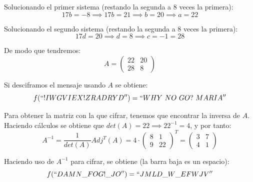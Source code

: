 \begin{problem}[3]
Solucionando el primer sistema (restando la segunda a 8 veces la primera):
\[17b = -8 \implies 17b = 21 \implies b = 20 \implies a = 22\]

Solucionando el segundo sistema (restando la segunda a 8 veces la primera):
\[17d = 20 \implies d = 8 \implies c = -1 = 28\]

De modo que tendremos:
\[
	A =
	\left( \begin{array}{cc}
	22 & 20 \\
	28 & 8
	\end{array} \right)
\]

Si desciframos el mensaje usando $A$ se obtiene:
\[f(``!IWGVIEX!ZRADRYD'') = ``WHY\ NO\ GO?\ MARIA''\]

\spart
Para obtener la matriz con la que cifrar, tenemos que encontrar la inversa de $A$. Haciendo cálculos se obtiene que $det(A)=22 \implies 22^{-1} = 4$, y por tanto:
\[
	A^{-1} = \frac{1}{det(A)} Adj^T(A) =
	4·
	\left( \begin{array}{cc}
	8 & 1 \\
	9 & 22
	\end{array} \right)^T
	=
	\left( \begin{array}{cc}
	3 & 7 \\
	4 & 1
	\end{array} \right)
\]

Haciendo uso de $A^{-1}$ para cifrar, se obtiene (la barra baja es un espacio):
\[f(``DAMN\_FOG!\_JO'')=``JMLD\_W\_EFWJV''\]
\end{problem}

